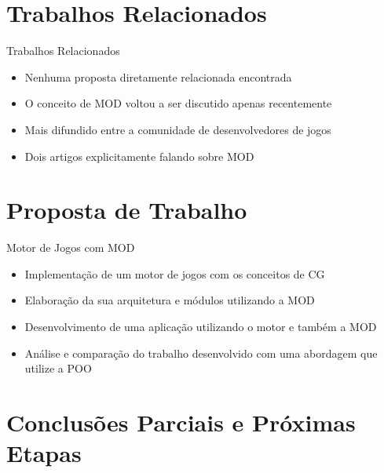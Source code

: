 \documentclass{beamer}
\begin{document}
\section{Trabalhos Relacionados}

\frame{\tableofcontents[currentsection]}

\begin{frame}[t]{Trabalhos Relacionados}
    \begin{itemize}
        \item Nenhuma proposta diretamente relacionada encontrada
        \item O conceito de MOD voltou a ser discutido apenas recentemente
        \item Mais difundido entre a comunidade de desenvolvedores de jogos
        \item Dois artigos explicitamente falando sobre MOD
    \end{itemize}
\end{frame}

\section{Proposta de Trabalho}

\frame{\tableofcontents[currentsection]}

\begin{frame}[t]{Motor de Jogos com MOD}
    \begin{itemize}
        \item Implementação de um motor de jogos com os conceitos de CG
        \item Elaboração da sua arquitetura e módulos utilizando a MOD
        \item Desenvolvimento de uma aplicação utilizando o motor e também a MOD
        \item Análise e comparação do trabalho desenvolvido com uma abordagem que 
            utilize a POO
    \end{itemize}
\end{frame}

\section{Conclusões Parciais e Próximas Etapas}

\frame{\tableofcontents[currentsection]}
\end{document}
